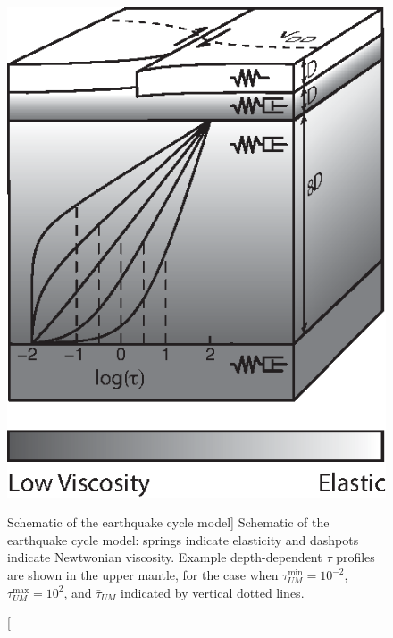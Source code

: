 \begin{figure}
\includegraphics{ch1/figures/Figure1.eps}
\caption
[Schematic of the earthquake cycle model]
{Schematic of the earthquake cycle model: springs indicate
elasticity and dashpots indicate Newtwonian viscosity. Example
depth-dependent $\tau$ profiles are shown in the upper mantle, for the
case when $\tau^{\min}_{UM} = 10^{-2}$, $\tau^{\max}_{UM} =10^{2}$,
and $\bar{\tau}_{UM}$ indicated by vertical dotted lines.}
\label{ch1:fig:1}
\end{figure}

